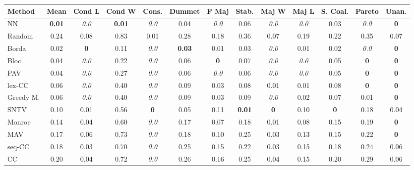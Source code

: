 \begin{tabular}{lcccccccccccc}
\toprule
Method & Mean & Cond L & Cond W & Cons. & Dummet & F Maj & Stab. & Maj W & Maj L & S. Coal. & Pareto & Unan. \\
\midrule
NN & \textbf{0.01} & \textit{0.0} & \textbf{0.01} & \textit{0.0} & 0.04 & \textit{0.0} & 0.06 & \textit{0.0} & \textit{0.0} & 0.03 & \textit{0.0} & \textbf{0} \\
Random & 0.24 & 0.08 & 0.83 & 0.01 & 0.28 & 0.18 & 0.36 & 0.07 & 0.19 & 0.22 & 0.35 & 0.07 \\
Borda & 0.02 & \textbf{0} & 0.11 & \textit{0.0} & \textbf{0.03} & 0.01 & 0.03 & \textit{0.0} & 0.01 & 0.02 & \textit{0.0} & \cellcolor{green!25}\textbf{0} \\
Bloc & 0.04 & \textit{0.0} & 0.22 & \textit{0.0} & 0.06 & \textbf{0} & 0.07 & \textit{0.0} & \textit{0.0} & 0.05 & \textbf{0} & \textbf{0} \\
PAV & 0.04 & \textit{0.0} & 0.27 & \textit{0.0} & 0.06 & \textit{0.0} & 0.06 & \textit{0.0} & \textit{0.0} & 0.05 & \cellcolor{green!25}\textbf{0} & \textbf{0} \\
lex-CC & 0.06 & \textit{0.0} & 0.40 & \textit{0.0} & 0.09 & 0.03 & 0.08 & 0.01 & 0.01 & 0.08 & \textbf{0} & \textbf{0} \\
Greedy M. & 0.06 & \textit{0.0} & 0.40 & \textit{0.0} & 0.09 & 0.03 & 0.09 & \textit{0.0} & 0.02 & 0.07 & 0.01 & \textbf{0} \\
SNTV & 0.10 & 0.01 & 0.56 & \textbf{0} & 0.05 & 0.11 & \textbf{0.01} & \textbf{0} & 0.10 & \textbf{0} & 0.18 & 0.04 \\
Monroe & 0.14 & 0.04 & 0.60 & \cellcolor{green!25}\textit{0.0} & 0.17 & 0.07 & 0.18 & 0.01 & 0.08 & 0.15 & 0.19 & \cellcolor{green!25}\textbf{0} \\
MAV & 0.17 & 0.06 & 0.73 & \textit{0.0} & 0.18 & 0.10 & 0.25 & 0.03 & 0.13 & 0.15 & 0.22 & \textbf{0} \\
seq-CC & 0.18 & 0.03 & 0.70 & \textit{0.0} & 0.25 & 0.15 & 0.22 & 0.03 & 0.15 & 0.18 & 0.24 & 0.06 \\
CC & 0.20 & 0.04 & 0.72 & \cellcolor{green!25}\textit{0.0} & 0.26 & 0.16 & 0.25 & 0.04 & 0.15 & 0.20 & 0.29 & 0.06 \\
\bottomrule
\end{tabular}
